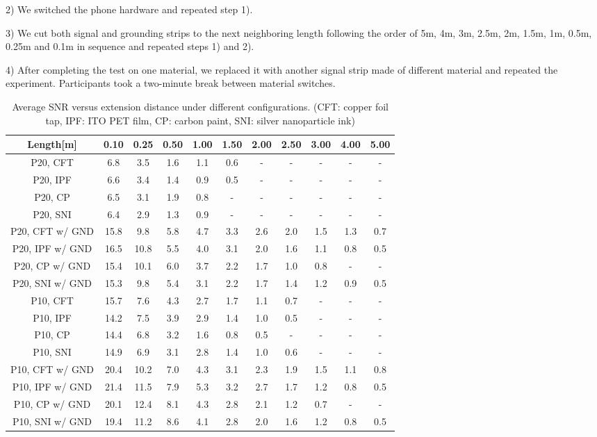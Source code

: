 2) We switched the phone hardware and repeated step 1).

3) We cut both signal and grounding strips to the next neighboring length following the order of 5m, 4m, 3m, 2.5m, 2m, 1.5m, 1m, 0.5m, 0.25m and 0.1m in sequence and repeated steps 1) and 2).

4) After completing the test on one material, we replaced it with another signal strip made of different material and repeated the experiment. Participants took a two-minute break between material switches.


\begin{table}[ht]
\caption{Average SNR versus extension distance under different configurations. (CFT: copper foil tap, IPF: ITO PET film, CP: carbon paint, SNI: silver nanoparticle ink)}
\vspace{-2mm}
\centering
	\begin{tabular}{|c|c|c|c|c|c|c|c|c|c|c|}
	
	\hline
	\textbf{Length[m]} & \textbf{0.10} & \textbf{0.25} & \textbf{0.50} & \textbf{1.00} & \textbf{1.50} & \textbf{2.00} & \textbf{2.50} & \textbf{3.00} & \textbf{4.00} & \textbf{5.00} \\
	\hline
	P20, CFT & 6.8 & 3.5 & 1.6 & 1.1 & 0.6 & - & - & - & - & - \\\hline
    P20, IPF & 6.6 & 3.4 & 1.4 & 0.9 & 0.5 & - & - & - & - & -  \\\hline
	P20, CP &  6.5 & 3.1 & 1.9 & 0.8 & - & - & - & - & - & -  \\\hline
	P20, SNI & 6.4 & 2.9 & 1.3 & 0.9 & - & - & - & - & - & -  \\\hline
	P20, CFT w/ GND &  15.8 & 9.8 & 5.8 & 4.7 & 3.3 & 2.6 & 2.0 & 1.5 & 1.3 & 0.7 \\\hline
	P20, IPF w/ GND &  16.5 & 10.8 & 5.5 & 4.0 & 3.1 & 2.0 & 1.6 & 1.1 & 0.8 & 0.5 \\\hline
	P20, CP w/ GND & 15.4 & 10.1 & 6.0 & 3.7 & 2.2 & 1.7 & 1.0 & 0.8 & - & - \\\hline
	P20, SNI w/ GND & 15.3 & 9.8 & 5.4 & 3.1 & 2.2 & 1.7 & 1.4 & 1.2 & 0.9 & 0.5  \\\hline

	P10, CFT & 15.7 & 7.6 & 4.3 & 2.7 & 1.7 & 1.1 & 0.7 & - & - & - \\\hline
	P10, IPF  & 14.2 & 7.5 & 3.9 & 2.9 & 1.4 & 1.0 & 0.5 & - & - & - \\\hline
	P10, CP &  14.4 & 6.8 & 3.2 & 1.6 & 0.8 & 0.5 & - & - & - & - \\\hline
	P10, SNI & 14.9 & 6.9 & 3.1 & 2.8 & 1.4 & 1.0 & 0.6 & - & - & -  \\\hline
	P10, CFT w/ GND & 20.4 & 10.2 & 7.0 & 4.3 & 3.1 & 2.3 & 1.9 & 1.5 & 1.1 & 0.8 \\\hline
	P10, IPF w/ GND  &  21.4 & 11.5 & 7.9 & 5.3 & 3.2 & 2.7 & 1.7 & 1.2 & 0.8 & 0.5 \\\hline
	P10, CP w/ GND & 20.1 & 12.4 & 8.1 & 4.3 & 2.8 & 2.1 & 1.2 & 0.7 & - & - \\\hline
	P10, SNI w/ GND &  19.4 & 11.2 & 8.6 & 4.1 & 2.8 & 2.0 & 1.6 & 1.2 & 0.8 & 0.5 \\\hline
	\end{tabular}
	

\end{table}
